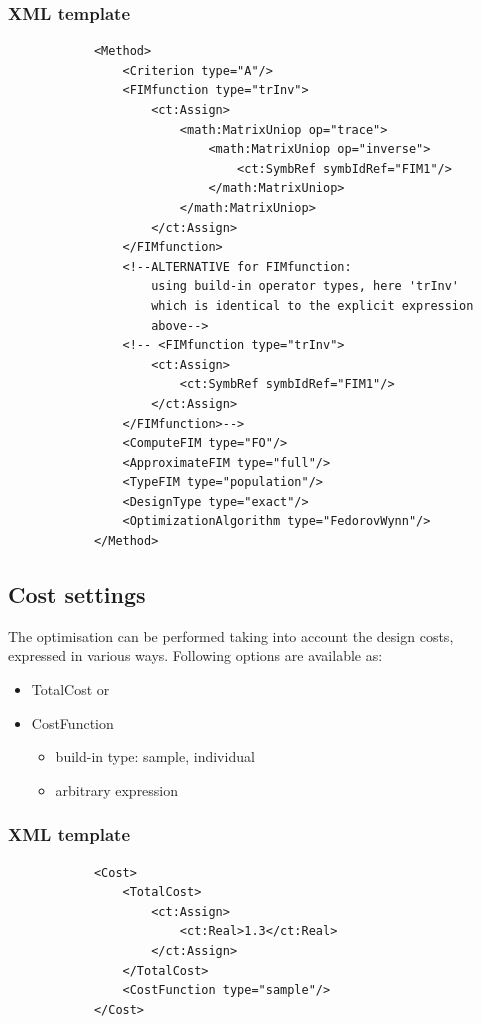 \subsubsection{XML template}
\lstset{language=XML}
\begin{lstlisting}
            <Method>
                <Criterion type="A"/>
                <FIMfunction type="trInv">
                    <ct:Assign>
                        <math:MatrixUniop op="trace">
                            <math:MatrixUniop op="inverse">
                                <ct:SymbRef symbIdRef="FIM1"/>
                            </math:MatrixUniop>
                        </math:MatrixUniop>
                    </ct:Assign>
                </FIMfunction>
                <!--ALTERNATIVE for FIMfunction: 
                    using build-in operator types, here 'trInv' 
                    which is identical to the explicit expression 
                    above-->
                <!-- <FIMfunction type="trInv">     
                    <ct:Assign>
                        <ct:SymbRef symbIdRef="FIM1"/>
                    </ct:Assign>
                </FIMfunction>-->
                <ComputeFIM type="FO"/>
                <ApproximateFIM type="full"/>
                <TypeFIM type="population"/>
                <DesignType type="exact"/>
                <OptimizationAlgorithm type="FedorovWynn"/>
            </Method>
\end{lstlisting}


\subsection{Cost settings}
The optimisation can be performed taking into account the design costs, expressed 
in various ways. Following options are available as: 
\begin{itemize}
\item 
TotalCost or
\item 
CostFunction
\begin{itemize}
\item 
build-in type: sample, individual
\item 
arbitrary expression
\end{itemize}
\end{itemize}

\subsubsection{XML template}
\lstset{language=XML}
\begin{lstlisting}
            <Cost>
                <TotalCost>
                    <ct:Assign>
                        <ct:Real>1.3</ct:Real>
                    </ct:Assign>
                </TotalCost>
                <CostFunction type="sample"/>
            </Cost>
\end{lstlisting}


